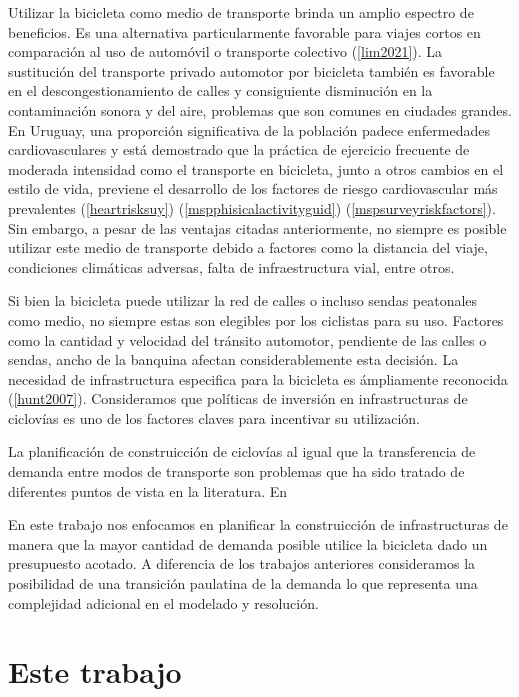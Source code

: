 \documentclass{article}
\begin{document}
  Utilizar la bicicleta como medio de transporte brinda un amplio espectro de beneficios. Es una alternativa particularmente favorable para viajes cortos en comparación al uso de automóvil o transporte colectivo (\ref{lim2021}). La sustitución del transporte privado automotor por bicicleta también es favorable en el descongestionamiento de calles y consiguiente disminución en la contaminación sonora y del aire, problemas que son comunes en ciudades grandes. En Uruguay, una proporción significativa de la población padece enfermedades cardiovasculares y está demostrado que la práctica de ejercicio frecuente de moderada intensidad como el transporte en bicicleta, junto a otros cambios en el estilo de vida, previene el desarrollo de los factores de riesgo cardiovascular más prevalentes (\ref{heartrisksuy}) (\ref{mspphisicalactivityguid}) (\ref{mspsurveyriskfactors}). Sin embargo, a pesar de las ventajas citadas anteriormente, no siempre es posible utilizar este medio de transporte debido a factores como la distancia del viaje, condiciones climáticas adversas, falta de infraestructura vial, entre otros.

  Si bien la bicicleta puede utilizar la red de calles o incluso sendas peatonales como medio, no siempre estas son elegibles por los ciclistas para su uso. Factores como la cantidad y velocidad del tránsito automotor, pendiente de las calles o sendas, ancho de la banquina afectan considerablemente esta decisión. La necesidad de infrastructura especifica para la bicicleta es ámpliamente reconocida (\ref{hunt2007}). Consideramos que políticas de inversión en infrastructuras de ciclovías es uno de los factores claves para incentivar su utilización.

  La planificación de construicción de ciclovías al igual que la transferencia de demanda entre modos de transporte son problemas que ha sido tratado de diferentes puntos de vista en la literatura. En 

  En este trabajo nos enfocamos en planificar la construicción de infrastructuras de manera que la mayor cantidad de demanda posible utilice la bicicleta dado un presupuesto acotado. A diferencia de los trabajos anteriores consideramos la posibilidad de una transición paulatina de la demanda lo que representa una complejidad adicional en el modelado y resolución.

  \section*{Este trabajo}
\end{document}
